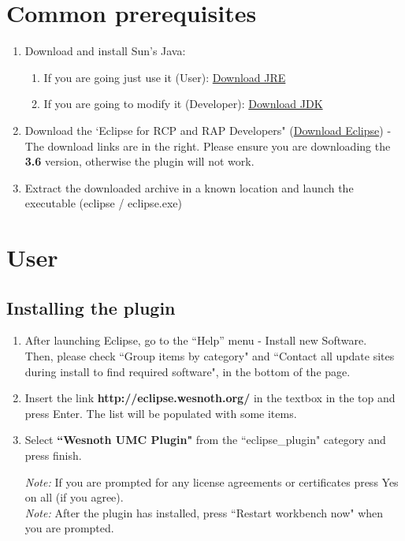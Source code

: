 \documentclass[10pt]{article}
\begin{document}
\section{Common prerequisites}
\begin{enumerate}
\item Download and install Sun's Java:
\begin{enumerate}
\item If you are going just use it (User): \href{https://cds.sun.com/is-bin/INTERSHOP.enfinity/WFS/CDS-CDS_Developer-Site/en_US/-/USD/ViewProductDetail-Start?ProductRef=jre-6u21-oth-JPR@CDS-CDS_Developer}{Download JRE}
\item If you are going to modify it (Developer): \href{http://java.sun.com/javase/downloads/widget/jdk6.jsp}{Download JDK}
\end{enumerate}
\item Download the  `Eclipse for RCP and RAP Developers" (\href{http://eclipse.org/downloads/packages/eclipse-rcp-and-rap-developers/heliosr}{Download Eclipse}) -
The download links are in the right. Please ensure you are downloading the \textbf{3.6} version,
otherwise the plugin will not work.
\item Extract the downloaded archive in a known location and launch the executable (eclipse / eclipse.exe)
\end{enumerate}

\section{User}
\subsection{Installing the plugin}
\begin{enumerate}
\item After launching Eclipse, go to the ``Help'' menu - Install new Software. \\
  Then, please check ``Group items by category" and ``Contact all update sites during install to find required software", in the bottom of the page.
\item Insert the link \textbf{http://eclipse.wesnoth.org/} in the textbox in the top and press Enter. The list will be populated with some items.
\item Select \textbf{``Wesnoth UMC Plugin"} from the ``eclipse\_plugin" category and press finish.

\textit{Note:} If you are prompted for any license agreements or certificates press Yes on all (if you agree).\\
\textit{Note:} After the plugin has installed, press ``Restart workbench now" when you are prompted.
\end{enumerate}
\end{document}
